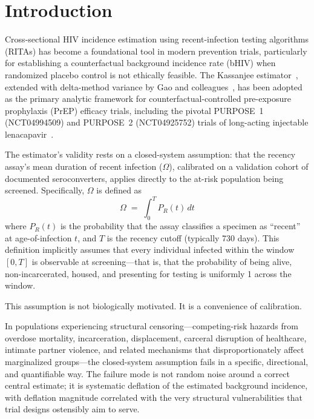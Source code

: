 \documentclass[11pt]{article}
\begin{document}
\vspace{1em}

\section{Introduction}

Cross-sectional HIV incidence estimation using recent-infection testing algorithms (RITAs) has become a foundational tool in modern prevention trials, particularly for establishing a counterfactual background incidence rate (bHIV) when randomized placebo control is not ethically feasible. The Kassanjee estimator~\cite{kassanjee2012}, extended with delta-method variance by Gao and colleagues~\cite{gao2021}, has been adopted as the primary analytic framework for counterfactual-controlled pre-exposure prophylaxis (PrEP) efficacy trials, including the pivotal PURPOSE~1 (NCT04994509) and PURPOSE~2 (NCT04925752) trials of long-acting injectable lenacapavir~\cite{bekker2024,kelley2025}.

The estimator's validity rests on a closed-system assumption: that the recency assay's mean duration of recent infection ($\Omega$), calibrated on a validation cohort of documented seroconverters, applies directly to the at-risk population being screened. Specifically, $\Omega$ is defined as
\begin{equation}
\Omega \;=\; \int_0^T P_R(t)\,dt \label{eq:omega_def}
\end{equation}
where $P_R(t)$ is the probability that the assay classifies a specimen as ``recent'' at age-of-infection $t$, and $T$ is the recency cutoff (typically 730 days). This definition implicitly assumes that every individual infected within the window $[0, T]$ is observable at screening---that is, that the probability of being alive, non-incarcerated, housed, and presenting for testing is uniformly 1 across the window.

This assumption is not biologically motivated. It is a convenience of calibration.

In populations experiencing structural censoring---competing-risk hazards from overdose mortality, incarceration, displacement, carceral disruption of healthcare, intimate partner violence, and related mechanisms that disproportionately affect marginalized groups---the closed-system assumption fails in a specific, directional, and quantifiable way. The failure mode is not random noise around a correct central estimate; it is systematic deflation of the estimated background incidence, with deflation magnitude correlated with the very structural vulnerabilities that trial designs ostensibly aim to serve.
\end{document}
